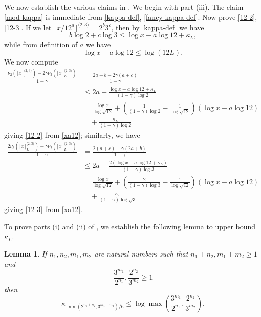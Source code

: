 \documentclass[10pt,a4paper,reqno]{amsart}
\numberwithin{equation}{section}
\theoremstyle{plain}
\newtheorem{lemma}[lemma]{Lemma}
\theoremstyle{definition}
\begin{document}
We now establish the various claims in .  We begin with part (iii).  The claim \eqref{mod-kappa} is immediate from \eqref{kappa-def}, \eqref{fancy-kappa-def}.  Now prove \eqref{12-2}, \eqref{12-3}.  If we let $\lceil x/12^a \rceil^{\langle 2,3 \rangle} = 2^b 3^c$, then by \eqref{kappa-def} we have
$$ b \log 2 + c \log 3 \leq \log x - a \log 12 + \kappa_L,$$
while from definition of $a$ we have
\begin{equation}\label{xa12}
  \log x - a \log 12 \leq \log(12L).
\end{equation}
We now compute
\begin{align*}
  \frac{\nu_2(\lceil x \rceil^{\langle 2,3\rangle}_L) - 2 \gamma \nu_3(\lceil x \rceil^{\langle 2,3\rangle}_L)}{1-\gamma}
  &= \frac{2a+b - 2\gamma(a+c)}{1-\gamma} \\
  &\leq 2a + \frac{\log x - a \log 12 + \kappa_L}{(1-\gamma) \log 2}  \\
  &= \frac{\log x}{\log \sqrt{12}} + \left( \frac{1}{(1-\gamma)\log 2} - \frac{1}{\log \sqrt{12}}\right) \left(\log x - a \log 12\right)\\
  &\quad
  + \frac{\kappa_L}{(1-\gamma)\log 2}
\end{align*}
giving \eqref{12-2} from \eqref{xa12}; similarly, we have
\begin{align*}
  \frac{2\nu_3(\lceil x \rceil^{\langle 2,3\rangle}_L) - \gamma \nu_2(\lceil x \rceil^{\langle 2,3\rangle}_L)}{1-\gamma}
  &= \frac{2(a+c) - \gamma(2a+b)}{1-\gamma} \\
  &\leq 2a + \frac{2(\log x - a \log 12 + \kappa_L)}{(1-\gamma) \log 3}  \\
  &= \frac{\log x}{\log \sqrt{12}} + \left( \frac{2}{(1-\gamma)\log 3} - \frac{1}{\log \sqrt{12}}\right) \left(\log x - a \log 12\right)\\
  &\quad + \frac{\kappa_L}{(1-\gamma)\log \sqrt{3}}
\end{align*}
giving \eqref{12-3} from \eqref{xa12}.

To prove parts (i) and (ii) of , we establish the following lemma to upper bound $\kappa_L$.

\begin{lemma}\label{lemcount-0}  If $n_1,n_2,m_1,m_2$ are natural numbers such that $n_1+n_2, m_1+m_2 \geq 1$ and
$$ \frac{3^{m_1}}{2^{n_1}}, \frac{2^{n_2}}{3^{m_2}} \geq 1$$
then
$$ \kappa_{\min( 2^{n_1+n_2},3^{m_1+m_2})/6} \leq \log \max\left(\frac{3^{m_1}}{2^{n_1}}, \frac{2^{n_2}}{3^{m_2}}\right).$$
\end{lemma}
\end{document}
